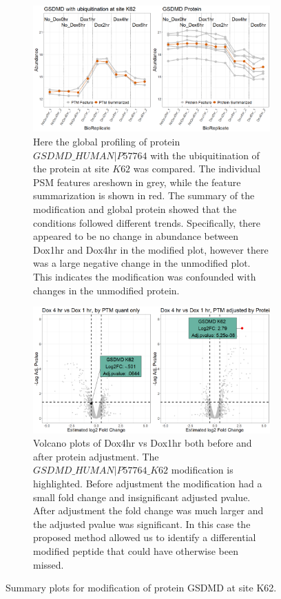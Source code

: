 \documentclass{mcp}
\begin{document}
\begin{figure}[h!]
\centering
 \begin{subfigure}{\textwidth}
 \centering
	\includegraphics[width=.9\textwidth]{sim_new/IpaH_prof_plot}
	\caption{Here the global profiling of protein $GSDMD\_HUMAN|P57764$ with the ubiquitination of the protein at site $K62$ was compared. The individual PSM features areshown in grey, while the feature summarization is shown in red. The summary of the modification and global protein showed that the conditions followed different trends. Specifically, there appeared to be no change in abundance between Dox1hr and Dox4hr in the modified plot, however there was a large negative change in the unmodified plot. This indicates the modification was confounded with changes in the unmodified protein.}
 \end{subfigure}
 \begin{subfigure}{\textwidth}
 \centering
	\includegraphics[width=.9\textwidth]{sim_new/IpaH_volcano_plot}
	\caption{Volcano plots of Dox4hr vs Dox1hr both before and after protein adjustment. The $GSDMD\_HUMAN|P57764\_K62$ modification is highlighted. Before adjustment the modification had a small fold change and insignificant adjusted pvalue. After adjustment the fold change was much larger and the adjusted pvalue was significant. In this case the proposed method allowed us to identify a differential modified peptide that could have otherwise been missed.}
 \end{subfigure}
\caption{Summary plots for modification of protein GSDMD at site K62.}
\label{fig:ipah_figures}
\end{figure}
\end{document}

